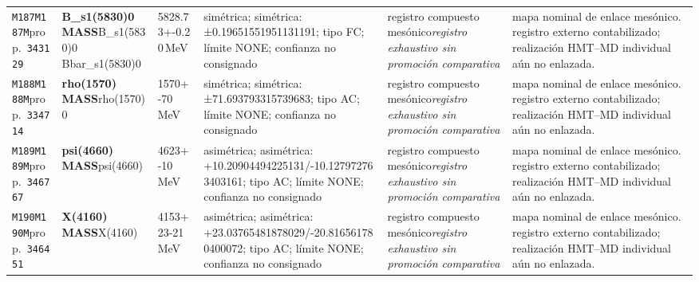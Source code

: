 \begin{landscape}
\begin{longtable}{L{1.85cm}L{4.45cm}L{2.35cm}L{4.05cm}L{3.35cm}L{7.15cm}}
\texttt{M187}\newline \texttt{M187M}\newline prop.\ \texttt{343129} & \textbf{B\_\allowbreak{}s1(5830)0 MASS}\newline B\_\allowbreak{}s1(5830)0 \textbar{}\allowbreak{} Bbar\_\allowbreak{}s1(5830)0 & 5828.73+-0.20\,MeV & simétrica; simétrica: ±0.19651551951131191; tipo FC; límite NONE; confianza no consignado & registro compuesto mesónico\newline \emph{registro exhaustivo sin promoción comparativa} & mapa nominal de enlace mesónico. registro externo contabilizado; realización HMT--MD individual aún no enlazada. \\
\texttt{M188}\newline \texttt{M188M}\newline prop.\ \texttt{334714} & \textbf{rho(1570) MASS}\newline rho(1570)0 & 1570+-70\,MeV & simétrica; simétrica: ±71.693793315739683; tipo AC; límite NONE; confianza no consignado & registro compuesto mesónico\newline \emph{registro exhaustivo sin promoción comparativa} & mapa nominal de enlace mesónico. registro externo contabilizado; realización HMT--MD individual aún no enlazada. \\
\texttt{M189}\newline \texttt{M189M}\newline prop.\ \texttt{346767} & \textbf{psi(4660) MASS}\newline psi(4660) & 4623+-10\,MeV & asimétrica; asimétrica: +10.20904494225131/-10.127972763403161; tipo AC; límite NONE; confianza no consignado & registro compuesto mesónico\newline \emph{registro exhaustivo sin promoción comparativa} & mapa nominal de enlace mesónico. registro externo contabilizado; realización HMT--MD individual aún no enlazada. \\
\texttt{M190}\newline \texttt{M190M}\newline prop.\ \texttt{346451} & \textbf{X(4160) MASS}\newline X(4160) & 4153+23-21\,MeV & asimétrica; asimétrica: +23.03765481878029/-20.816561780400072; tipo AC; límite NONE; confianza no consignado & registro compuesto mesónico\newline \emph{registro exhaustivo sin promoción comparativa} & mapa nominal de enlace mesónico. registro externo contabilizado; realización HMT--MD individual aún no enlazada. \\

\end{longtable}
\end{landscape}

